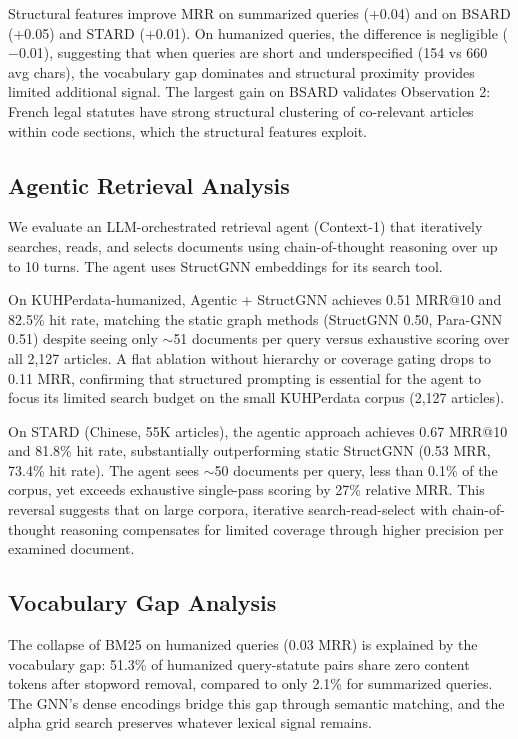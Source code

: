 Structural features improve MRR on summarized queries (+0.04) and on BSARD (+0.05) and STARD (+0.01). On humanized queries, the difference is negligible ($-$0.01), suggesting that when queries are short and underspecified (154 vs 660 avg chars), the vocabulary gap dominates and structural proximity provides limited additional signal. The largest gain on BSARD validates Observation 2: French legal statutes have strong structural clustering of co-relevant articles within code sections, which the structural features exploit.

\subsection{Agentic Retrieval Analysis}

We evaluate an LLM-orchestrated retrieval agent (Context-1) that iteratively searches, reads, and selects documents using chain-of-thought reasoning over up to 10 turns. The agent uses StructGNN embeddings for its search tool.

On KUHPerdata-humanized, Agentic + StructGNN achieves 0.51 MRR@10 and 82.5\% hit rate, matching the static graph methods (StructGNN 0.50, Para-GNN 0.51) despite seeing only ${\sim}$51 documents per query versus exhaustive scoring over all 2,127 articles. A flat ablation without hierarchy or coverage gating drops to 0.11 MRR, confirming that structured prompting is essential for the agent to focus its limited search budget on the small KUHPerdata corpus (2,127 articles).

On STARD (Chinese, 55K articles), the agentic approach achieves 0.67 MRR@10 and 81.8\% hit rate, substantially outperforming static StructGNN (0.53 MRR, 73.4\% hit rate). The agent sees ${\sim}$50 documents per query, less than 0.1\% of the corpus, yet exceeds exhaustive single-pass scoring by 27\% relative MRR. This reversal suggests that on large corpora, iterative search-read-select with chain-of-thought reasoning compensates for limited coverage through higher precision per examined document.

\subsection{Vocabulary Gap Analysis}

The collapse of BM25 on humanized queries (0.03 MRR) is explained by the vocabulary gap: 51.3\% of humanized query-statute pairs share zero content tokens after stopword removal, compared to only 2.1\% for summarized queries. The GNN's dense encodings bridge this gap through semantic matching, and the alpha grid search preserves whatever lexical signal remains.
